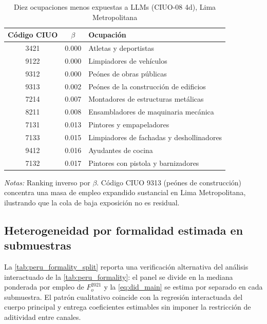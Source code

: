 \begin{table}[H]
\centering
\small
\begin{threeparttable}
\caption{Diez ocupaciones menos expuestas a LLMs (CIUO-08 4d), Lima Metropolitana}
\label{tab:peru_bottom10}
\begin{tabular}{c c l}
\toprule
C\'{o}digo CIUO & $\beta$ & Ocupaci\'{o}n \\
\midrule
3421 & 0.000 & Atletas y deportistas \\
9122 & 0.000 & Limpiadores de veh\'{i}culos \\
9312 & 0.000 & Pe\'{o}nes de obras p\'{u}blicas \\
9313 & 0.002 & Pe\'{o}nes de la construcci\'{o}n de edificios \\
7214 & 0.007 & Montadores de estructuras met\'{a}licas \\
8211 & 0.008 & Ensambladores de maquinaria mec\'{a}nica \\
7131 & 0.013 & Pintores y empapeladores \\
7133 & 0.015 & Limpiadores de fachadas y deshollinadores \\
9412 & 0.016 & Ayudantes de cocina \\
7132 & 0.017 & Pintores con pistola y barnizadores \\
\bottomrule
\end{tabular}
\begin{tablenotes}[flushleft]
\footnotesize
\item \emph{Notas:} Ranking inverso por $\beta$. C\'{o}digo CIUO 9313 (pe\'{o}nes de construcci\'{o}n) concentra una masa de empleo expandido sustancial en Lima Metropolitana, ilustrando que la cola de baja exposici\'{o}n no es residual.
\end{tablenotes}
\end{threeparttable}
\end{table}


\subsection{Heterogeneidad por formalidad estimada en submuestras}
\label{app:peru_subsamples}

La \cref{tab:peru_formality_split} reporta una verificaci\'{o}n alternativa del an\'{a}lisis interactuado de la \cref{tab:peru_formality}: el panel se divide en la mediana ponderada por empleo de $F_o^{2021}$ y la \cref{eq:did_main} se estima por separado en cada submuestra. El patr\'{o}n cualitativo coincide con la regresi\'{o}n interactuada del cuerpo principal y entrega coeficientes estimables sin imponer la restricci\'{o}n de aditividad entre canales.

